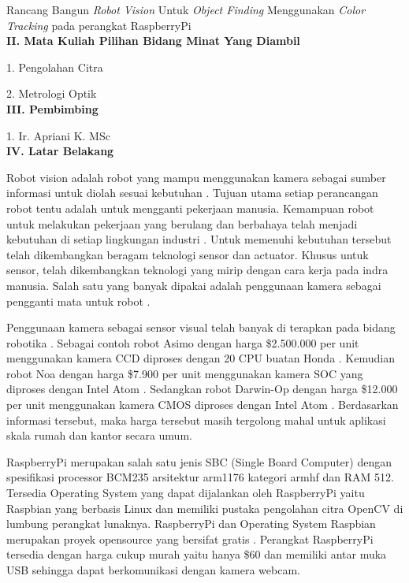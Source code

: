 \documentclass[a4paper,12pt]{article}
\begin{document}
Rancang Bangun \textit{Robot Vision} Untuk \textit{Object Finding} Menggunakan \textit{Color Tracking} pada perangkat RaspberryPi
\\[10pt]
\noindent \textbf{II. \hspace{9pt} Mata Kuliah Pilihan Bidang Minat Yang Diambil}

1. Pengolahan Citra

2. Metrologi Optik
\\[10pt]
\noindent \textbf{III. \hspace{8pt} Pembimbing}

1. Ir. Apriani K. MSc
\\[10pt]
\noindent \textbf{IV. \hspace{9pt} Latar Belakang} 

Robot vision adalah robot yang mampu menggunakan kamera sebagai sumber informasi untuk diolah sesuai kebutuhan \cite{robot}.
Tujuan utama setiap perancangan robot tentu adalah untuk mengganti pekerjaan manusia.
Kemampuan robot untuk melakukan pekerjaan yang berulang dan berbahaya telah menjadi kebutuhan di setiap lingkungan industri \cite{robot_function} . 
Untuk memenuhi kebutuhan tersebut telah dikembangkan beragam teknologi sensor dan actuator.
Khusus untuk sensor, telah dikembangkan teknologi yang mirip dengan cara kerja pada indra manusia.
Salah satu yang banyak dipakai adalah penggunaan kamera sebagai pengganti mata untuk robot \cite{robot}.

Penggunaan kamera sebagai sensor visual telah banyak di terapkan pada bidang robotika \cite{robot}.
Sebagai contoh robot Asimo dengan harga \$2.500.000 per unit menggunakan kamera CCD diproses dengan 20 CPU buatan Honda \cite{asimo}.
Kemudian robot Noa dengan harga \$7.900 per unit menggunakan kamera SOC yang diproses dengan Intel Atom \cite{nao}.
Sedangkan robot Darwin-Op dengan harga \$12.000 per unit menggunakan kamera CMOS diproses dengan Intel Atom \cite{darwinop}.
Berdasarkan informasi tersebut, maka harga tersebut masih tergolong mahal untuk aplikasi skala rumah dan kantor secara umum.

RaspberryPi merupakan salah satu jenis SBC (Single Board Computer) dengan spesifikasi processor BCM235 arsitektur arm1176 kategori armhf dan RAM 512.
Tersedia Operating System yang dapat dijalankan oleh RaspberryPi yaitu Raspbian yang berbasis Linux dan memiliki pustaka pengolahan citra OpenCV di lumbung perangkat lunaknya.
RaspberryPi dan Operating System Raspbian merupakan proyek opensource yang bersifat gratis \cite{raspi}.
Perangkat RaspberryPi tersedia dengan harga cukup murah yaitu hanya \$60 dan memiliki antar muka USB sehingga dapat berkomunikasi dengan kamera webcam.
\end{document}
